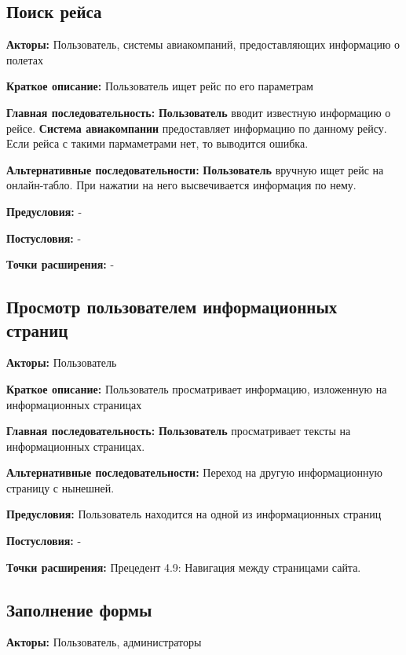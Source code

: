 \subsection{Поиск рейса}

\textbf{Акторы:} Пользователь, системы авиакомпаний, предоставляющих информацию о полетах

\textbf{Краткое описание:} Пользователь ищет рейс по его параметрам

\textbf{Главная последовательность:} \textbf{Пользователь} вводит известную информацию о рейсе. \textbf{Система авиакомпании} 
предоставляет информацию по данному рейсу. Если рейса с такими пармаметрами нет, то выводится ошибка.

\textbf{Альтернативные последовательности:} \textbf{Пользователь} вручную ищет рейс на онлайн-табло. При нажатии
на него высвечивается информация по нему.

\textbf{Предусловия:} -

\textbf{Постусловия:} -

\textbf{Точки расширения:} -




\subsection{Просмотр пользователем информационных страниц}

\textbf{Акторы:} Пользователь

\textbf{Краткое описание:} Пользователь просматривает информацию, изложенную на информационных страницах

\textbf{Главная последовательность:} \textbf{Пользователь} просматривает тексты на информационных
страницах.

\textbf{Альтернативные последовательности:} Переход на другую информационную страницу с нынешней.

\textbf{Предусловия:} Пользователь находится на одной из информационных страниц

\textbf{Постусловия:} -

\textbf{Точки расширения:} Прецедент 4.9: Навигация между страницами сайта.




\subsection{Заполнение формы}

\textbf{Акторы:} Пользователь, администраторы

